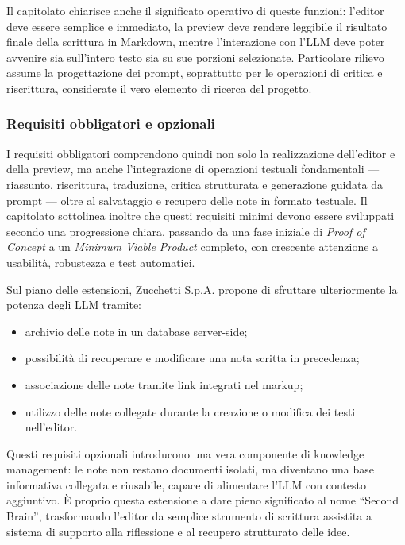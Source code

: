 \documentclass[a4paper,12pt]{article}
\begin{document}
Il capitolato chiarisce anche il significato operativo di queste funzioni: l'editor deve essere semplice e immediato, la preview deve rendere leggibile il risultato finale della scrittura in Markdown, mentre l'interazione con l'LLM deve poter avvenire sia sull'intero testo sia su sue porzioni selezionate. Particolare rilievo assume la progettazione dei prompt, soprattutto per le operazioni di critica e riscrittura, considerate il vero elemento di ricerca del progetto.

\subsubsection{Requisiti obbligatori e opzionali}

I requisiti obbligatori comprendono quindi non solo la realizzazione dell'editor e della preview, ma anche l'integrazione di operazioni testuali fondamentali --- riassunto, riscrittura, traduzione, critica strutturata e generazione guidata da prompt --- oltre al salvataggio e recupero delle note in formato testuale. Il capitolato sottolinea inoltre che questi requisiti minimi devono essere sviluppati secondo una progressione chiara, passando da una fase iniziale di \textit{Proof of Concept} a un \textit{Minimum Viable Product} completo, con crescente attenzione a usabilità, robustezza e test automatici.

Sul piano delle estensioni, Zucchetti S.p.A. propone di sfruttare ulteriormente la potenza degli LLM tramite:
\begin{itemize}
    \item archivio delle note in un database server-side;
    \item possibilità di recuperare e modificare una nota scritta in precedenza;
    \item associazione delle note tramite link integrati nel markup;
    \item utilizzo delle note collegate durante la creazione o modifica dei testi nell’editor.
\end{itemize}

Questi requisiti opzionali introducono una vera componente di knowledge management: le note non restano documenti isolati, ma diventano una base informativa collegata e riusabile, capace di alimentare l'LLM con contesto aggiuntivo. È proprio questa estensione a dare pieno significato al nome ``Second Brain'', trasformando l'editor da semplice strumento di scrittura assistita a sistema di supporto alla riflessione e al recupero strutturato delle idee.
\end{document}

